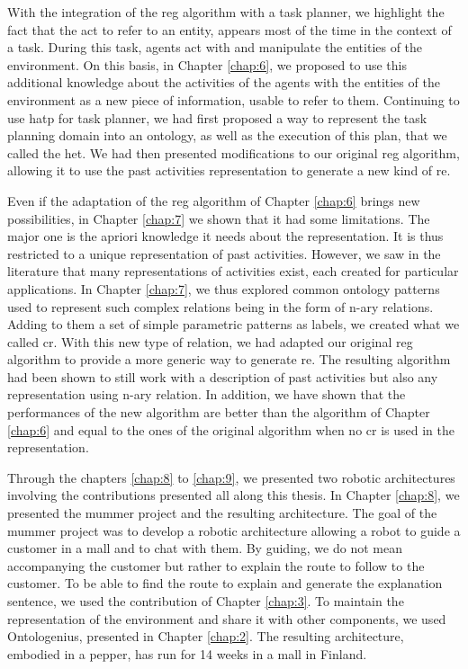 With the integration of the \acrshort{reg} algorithm with a task planner, we highlight the fact that the act to refer to an entity, appears most of the time in the context of a task. During this task, agents act with and manipulate the entities of the environment. On this basis, in Chapter \ref{chap:6}, we proposed to use this additional knowledge about the activities of the agents with the entities of the environment as a new piece of information, usable to refer to them. Continuing to use \acrshort{hatp} for task planner, we had first proposed a way to represent the task planning domain into an ontology, as well as the execution of this plan, that we called the \acrfull{het}. We had then presented modifications to our original \acrshort{reg} algorithm, allowing it to use the past activities representation to generate a new kind of \acrfull{re}.

Even if the adaptation of the \acrshort{reg} algorithm of Chapter \ref{chap:6} brings new possibilities, in Chapter \ref{chap:7} we shown that it had some limitations. The major one is the apriori knowledge it needs about the representation. It is thus restricted to a unique representation of past activities. However, we saw in the literature that many representations of activities exist, each created for particular applications. In Chapter \ref{chap:7}, we thus explored common ontology patterns used to represent such complex relations being in the form of n-ary relations. Adding to them a set of simple parametric patterns as labels, we created what we called \acrfull{cr}. With this new type of relation, we had adapted our original \acrshort{reg} algorithm to provide a more generic way to generate \acrshort{re}. The resulting algorithm had been shown to still work with a description of past activities but also any representation using n-ary relation. In addition, we have shown that the performances of the new algorithm are better than the algorithm of Chapter \ref{chap:6} and equal to the ones of the original algorithm when no \acrshort{cr} is used in the representation.

Through the chapters \ref{chap:8} to \ref{chap:9}, we presented two robotic architectures involving the contributions presented all along this thesis. In Chapter \ref{chap:8}, we presented the \acrfull{mummer} project and the resulting architecture. The goal of the \acrshort{mummer} project was to develop a robotic architecture allowing a robot to guide a customer in a mall and to chat with them. By guiding, we do not mean accompanying the customer but rather to explain the route to follow to the customer. To be able to find the route to explain and generate the explanation sentence, we used the contribution of Chapter \ref{chap:3}. To maintain the representation of the environment and share it with other components, we used Ontologenius, presented in Chapter \ref{chap:2}. The resulting architecture, embodied in a pepper, has run for 14 weeks in a mall in Finland.

